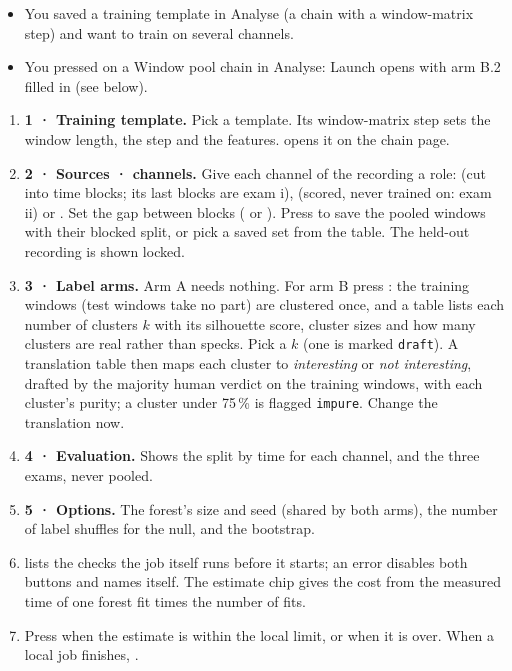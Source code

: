 \begin{itemize}
  \item You saved a training template in Analyse (a chain with a window-matrix step) and want to
        train on several channels.
  \item You pressed  on a Window pool chain in Analyse: Launch opens with arm B.2
        filled in (see below).
\end{itemize}


\begin{enumerate}
  \item \textbf{1 · Training template.} Pick a template. Its window-matrix step sets the window
        length, the step and the features.  opens it on the chain page.
  \item \textbf{2 · Sources · channels.} Give each channel of the recording a role: 
        (cut into time blocks; its last blocks are exam i),  (scored, never trained on:
        exam ii) or . Set the gap between blocks ( or
        ). Press  to save the pooled windows with their
        blocked split, or pick a saved set from the table. The held-out recording is shown locked.
  \item \textbf{3 · Label arms.} Arm A needs nothing. For arm B press : the training
        windows (test windows take no part) are clustered once, and a table lists each number of
        clusters \(k\) with its silhouette score, cluster sizes and how many clusters are real rather
        than specks. Pick a \(k\) (one is marked \texttt{draft}). A translation table then maps each
        cluster to \emph{interesting} or \emph{not interesting}, drafted by the majority human verdict
        on the training windows, with each cluster's purity; a cluster under 75\,\% is flagged
        \texttt{impure}. Change the translation now.
  \item \textbf{4 · Evaluation.} Shows the split by time for each channel, and the three exams,
        never pooled.
  \item \textbf{5 · Options.} The forest's size and seed (shared by both arms), the number of
        label shuffles for the null, and the bootstrap.
  \item {} lists the checks the job itself runs before it starts; an error disables
        both buttons and names itself. The estimate chip gives the cost from the measured time of one
        forest fit times the number of fits.
  \item Press  when the estimate is within the local limit, or
         when it is over. When a local job finishes, .
\end{enumerate}

